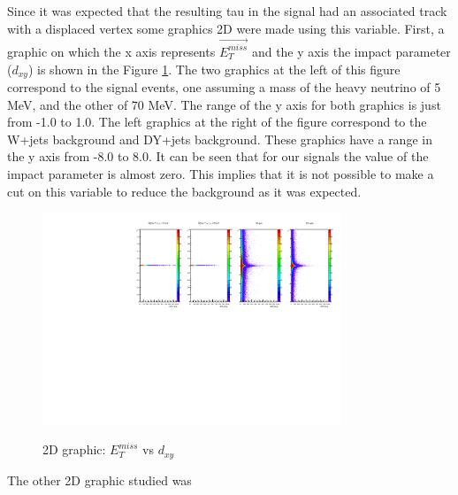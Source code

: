 Since it was expected that the resulting tau in the signal had an associated track with a displaced vertex some graphics 2D were made using this variable. First, a graphic on which the x axis 
represents $\vec{E_T^{miss}}$ and the y axis the impact parameter ($d_{xy}$) is shown in the Figure \ref{ipt1_MET}. The two graphics at the left of this figure correspond to the signal events, one 
assuming a mass of the heavy neutrino of 5 MeV, and the other of 70 MeV. The range of the y axis for both graphics is just from -1.0 to 1.0. The left graphics at the right of the figure correspond 
to the W+jets background and DY+jets background. These graphics have a range in the y axis from -8.0 to 8.0. It can be seen that for our signals the value of the impact parameter is almost zero. 
This implies that it is not possible to make a cut on this variable to reduce the background as it was expected. 
 
 \begin{figure}[h] 
 \centering
 \caption{2D graphic: $E_T^{miss}$ vs $d_{xy}$}
 \includegraphics[width=0.8\textwidth]{./Capitulos/Analysis/c1} 
 \label{ipt1_MET}
 \end{figure}
 
 The other 2D graphic studied was 
 
 
 
 